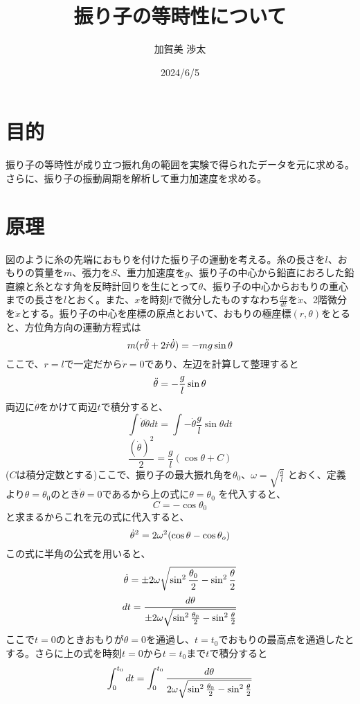 \documentclass{jlreq}
\begin{document}
  \title{振り子の等時性について}
  \date{2024/6/5}
  \author{加賀美 渉太}
  \maketitle

  \tableofcontents

  \section{目的}
  振り子の等時性が成り立つ振れ角の範囲を実験で得られたデータを元に求める。さらに、振り子の振動周期を解析して重力加速度を求める。
  
  \section{原理}
  図のように糸の先端におもりを付けた振り子の運動を考える。糸の長さを$l$、おもりの質量を$m$、張力を$S$、重力加速度を$g$、振り子の中心から鉛直におろした鉛直線と糸となす角を反時計回りを生にとって$\theta$、振り子の中心からおもりの重心までの長さを$l$とおく。また、$x$を時刻$t$で微分したものすなわち$\frac{dx}{dt}$を$\dot{x}$、2階微分を$\ddot{x}$とする。振り子の中心を座標の原点とおいて、おもりの極座標$(r,\theta)$をとると、方位角方向の運動方程式は\[m(r\ddot{\theta}+2\dot{r}\dot{\theta})=-mg\sin \theta \\\]
  ここで、$r=l$で一定だから$\dot{r}=0$であり、左辺を計算して整理すると
  \[\ddot{\theta}=-\frac{g}{l}\sin \theta \\\]
  両辺に$\dot{\theta}$をかけて両辺$t$で積分すると、
  \[\int \dot{\theta}\ddot{\theta}dt=\int -\dot{\theta}\frac{g}{l}\sin \theta dt\]
  \[\frac{(\dot{\theta})^2}{2}=\frac{g}{l}(\cos \theta + C)\]
  ($C$は積分定数とする)ここで、振り子の最大振れ角を$\theta_0$、$\omega=\sqrt{\frac{g}{l}}$
  とおく、定義より$\theta=\theta_0$のとき$\dot{\theta}=0$であるから上の式に$\theta=\theta_0$
  を代入すると、
  \[C=-\cos \theta_0\]
  と求まるからこれを元の式に代入すると、
  \[\dot{\theta}^2=2\omega^2(\cos \theta \\ - \cos \theta_o)\]
  この式に半角の公式を用いると、
  \[\dot{\theta}=\pm2\omega\sqrt{\sin^2 \frac{\theta_0}{2} \\- \sin^2 \frac{\theta}{2}}\]
  \[dt=\frac{d\theta}{\pm2\omega\sqrt{\sin^2 \frac{\theta_0}{2} \\-\sin^2 \frac{\theta}{2}}}\]
  ここで$t=0$のときおもりが$\theta=0$を通過し、$t=t_0$でおもりの最高点を通過したとする。さらに上の式を時刻$t=0$から$t=t_0$まで$t$で積分すると
  \[\int_{0}^{t_0}dt=\int_{0}^{t_0}\frac{d\theta}{2\omega\sqrt{\sin^2 \frac{\theta_0}{2} \\-\sin^2 \frac{\theta}{2}}}\]
\end{document}
